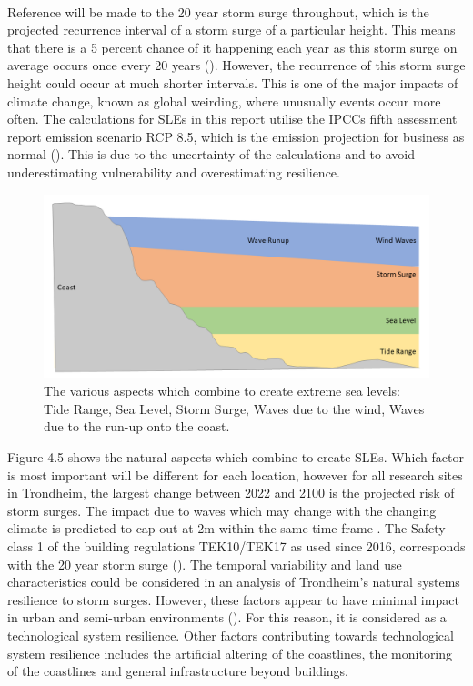 \paragraph{}

Reference will be made to the 20 year storm surge throughout, which is the projected recurrence interval of a storm surge of a particular height.  This means that there is a 5 percent chance of it happening each year as this storm surge on average occurs once every 20 years (\cite{hanssen_saksframlegg_2013}). However, the recurrence of this storm surge height could occur at much shorter intervals.  This is one of the major impacts of climate change, known as global weirding, where unusually events occur more often. The calculations for SLEs in this report utilise the IPCCs fifth assessment report emission scenario RCP 8.5, which is the emission projection for business as normal (\cite{hanssen-bauer_climate_2017}). This is due to the uncertainty of the calculations and to avoid underestimating vulnerability and overestimating resilience.  



\begin{figure}[h!]
    \centering
    \includegraphics[width=1\textwidth]{fig_theory/sea level extremes.png}
    \caption{The various aspects which combine to create extreme sea levels: Tide Range, Sea Level, Storm Surge, Waves due to the wind, Waves due to the run-up onto the coast.}
    \label{fig:my_label}
\end{figure}

Figure 4.5 shows the natural aspects which combine to create SLEs. Which factor is most important will be different for each location, however for all research sites in Trondheim, the largest change between 2022 and 2100 is the projected risk of storm surges. The impact due to waves which may change with the changing climate is predicted to cap out at 2m within the same time frame \cite{hanssen_saksframlegg_2013}. The Safety class 1 of the building regulations TEK10/TEK17 as used since 2016, corresponds with the 20 year storm surge (\cite{tides_high_2022}). The temporal variability and land use characteristics could be considered in an analysis of Trondheim's natural systems resilience to storm surges. However, these factors appear to have minimal impact in urban and semi-urban environments (\cite{hoffken_effects_2020}). For this reason, it is considered as a technological system resilience. Other factors contributing towards technological system resilience includes the artificial altering of the coastlines, the monitoring of the coastlines and general infrastructure beyond buildings.

